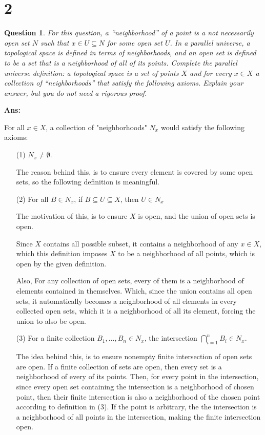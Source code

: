 \documentclass{article}
\newtheorem{question}{Question}
\begin{document}
\section*{2}
\begin{question}
    For this question, a “neighborhood” of a point is a not necessarily open
    set $ N$ such that $x\in U\subseteq N$ for some open set $U$. In a parallel universe, a
    topological space is defined in terms of neighborhoods, and an open set is defined
    to be a set that is a neighborhood of all of its points. Complete the parallel
    universe definition: a topological space is a set of points $X$ and for every $x\in X$
    a collection of “neighborhoods” that satisfy the following axioms. Explain your
    answer, but you do not need a rigorous proof.
\end{question}

\textbf{Ans:}

For all $x\in X$, a collection of "neighborhoods" $N_x$ would satisfy the following axioms:
\begin{itemize}
    \item[(1)]$N_x\neq \emptyset$.
    
    The reason behind this, is to ensure every element is covered by some open sets, so the following definition is meaningful.

    \hfill

    \item[(2)] For all $B\in N_x$, if $B\subseteq U\subseteq X$, then $U\in N_x$
    
    The motivation of this, is to ensure $X$ is open, and the union of open sets is open.

    Since $X$ contains all possible subset, it contains a neighborhood of any $x\in X$, which this definition
    imposes $X$ to be a neighborhood of all points, which is open by the given definition.

    Also, For any collection of open sets, every of them is a neighborhood of elements contained in themselves.
    Which, since the union contains all open sets, it automatically becomes a neighborhood of all elements in every
    collected open sets, which it is a neighborhood of all its element, forcing the union to also be open.

    \hfill

    \item[(3)] For a finite collection $B_1,...,B_n\in N_x$, the intersection $\bigcap_{i=1}^{n}B_i \in N_x$.
    
    The idea behind this, is to ensure nonempty finite intersection of open sets are open.
    If a finite collection of sets are open, then every set is a neighborhood of every of its points.
    Then, for every point in the intersection, since every open set containing the intersection is a neighborhood of chosen point,
    then their finite intersection is also a neighborhood of the chosen point according to definition in (3). If the point is arbitrary, the the intersection is a 
    neighborhood of all points in the intersection, making the finite intersection open.
\end{itemize}
\end{document}
